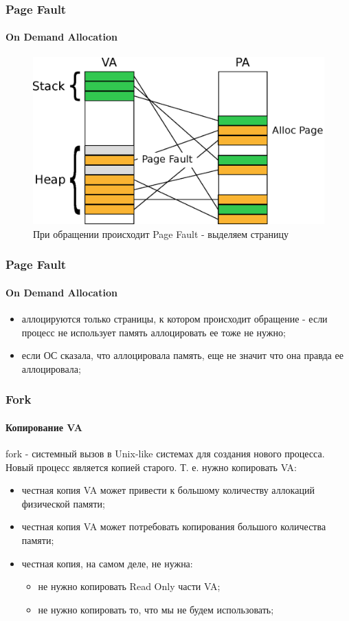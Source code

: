 \begin{frame}
\frametitle{Page Fault}
\framesubtitle{On Demand Allocation}

\begin{figure}
  \centering\includegraphics[width=.9\linewidth]{page-demand2}
  \caption{При обращении происходит Page Fault - выделяем страницу}
\end{figure}
\end{frame}

\begin{frame}
\frametitle{Page Fault}
\framesubtitle{On Demand Allocation}

\begin{itemize}
  \item<1-> аллоцируются только страницы, к котором происходит обращение - если процесс не использует память аллоцировать ее тоже не нужно;
  \item<2-> если ОС сказала, что аллоцировала память, еще не значит что она правда ее аллоцировала; 
\end{itemize}
\end{frame}

\begin{frame}
\frametitle{Fork}
\framesubtitle{Копирование VA}

fork - системный вызов в Unix-like системах для создания нового процесса. Новый
процесс является копией старого. Т. е. нужно копировать VA:

\begin{itemize}
  \item честная копия VA может привести к большому количеству аллокаций физической памяти;
  \item честная копия VA может потребовать копирования большого количества памяти;
  \item<2-> честная копия, на самом деле, не нужна:
    \begin{itemize}
       \item не нужно копировать Read Only части VA;
       \item не нужно копировать то, что мы не будем использовать;
    \end{itemize}
\end{itemize}
\end{frame}

